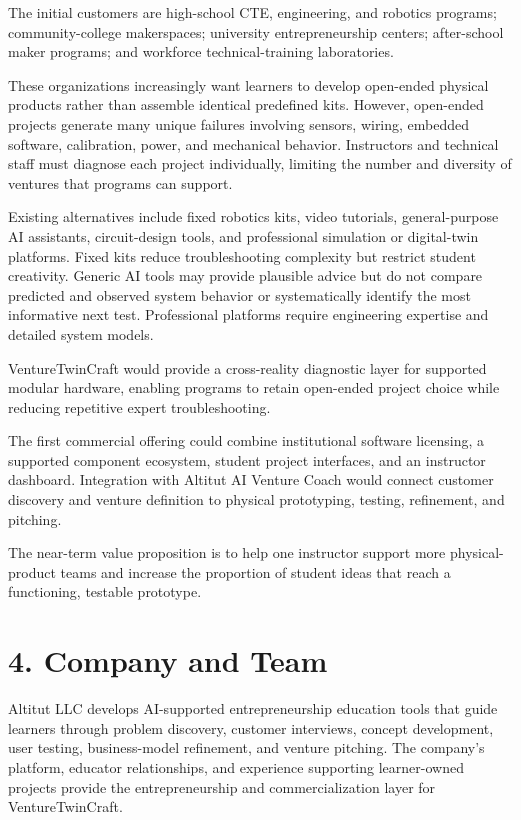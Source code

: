 The initial customers are high-school CTE, engineering, and robotics programs; community-college makerspaces; university entrepreneurship centers; after-school maker programs; and workforce technical-training laboratories.

These organizations increasingly want learners to develop open-ended physical products rather than assemble identical predefined kits. However, open-ended projects generate many unique failures involving sensors, wiring, embedded software, calibration, power, and mechanical behavior. Instructors and technical staff must diagnose each project individually, limiting the number and diversity of ventures that programs can support.

Existing alternatives include fixed robotics kits, video tutorials, general-purpose AI assistants, circuit-design tools, and professional simulation or digital-twin platforms. Fixed kits reduce troubleshooting complexity but restrict student creativity. Generic AI tools may provide plausible advice but do not compare predicted and observed system behavior or systematically identify the most informative next test. Professional platforms require engineering expertise and detailed system models.

VentureTwinCraft would provide a cross-reality diagnostic layer for supported modular hardware, enabling programs to retain open-ended project choice while reducing repetitive expert troubleshooting.

The first commercial offering could combine institutional software licensing, a supported component ecosystem, student project interfaces, and an instructor dashboard. Integration with Altitut AI Venture Coach would connect customer discovery and venture definition to physical prototyping, testing, refinement, and pitching.

The near-term value proposition is to help one instructor support more physical-product teams and increase the proportion of student ideas that reach a functioning, testable prototype.

\section{4. Company and Team}

Altitut LLC develops AI-supported entrepreneurship education tools that guide learners through problem discovery, customer interviews, concept development, user testing, business-model refinement, and venture pitching. The company’s platform, educator relationships, and experience supporting learner-owned projects provide the entrepreneurship and commercialization layer for VentureTwinCraft.

